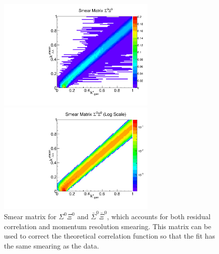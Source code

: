 \begin{figure}[h]
\begin{minipage}{18pc}
\includegraphics[width=18pc]{Figures/SmearMatrices/2016-7-19-SmearMatrixSigmaXi0NormLLAA.pdf}
\end{minipage}\hspace{2pc}
\begin{minipage}{18pc}
\includegraphics[width=18pc]{Figures/SmearMatrices/2016-7-19-SmearMatrixSigmaXi0NormLLAALog.pdf}
\end{minipage} 
\caption[Smear matrix -- $\Sigma^0\Xi^0$ and $\bar{\Sigma}^0\bar{\Xi}^0$]{
Smear matrix for $\Sigma^0\Xi^0$ and $\bar{\Sigma}^0\bar{\Xi}^0$, which accounts for both residual correlation and momentum resolution smearing. This matrix can be used to correct the theoretical correlation function so that the fit has the same smearing as the data.
}
\end{figure}


